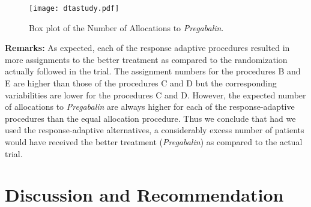 \begin{figure}
\begin{center}
\texttt{[image: dtastudy.pdf]}
\caption{Box plot of the Number of Allocations to \textit{Pregabalin}.}
\end{center}
\end{figure}

\newpage
\noindent\textbf{Remarks:} As expected, each of the response adaptive procedures resulted in more assignments to the better treatment as compared to the randomization actually followed in the trial. The assignment numbers for the procedures B and E are  higher than those of the procedures C and D  but the corresponding variabilities are lower for the procedures C and D. However, the expected number of allocations to \textit{Pregabalin} are always higher  for  each of  the response-adaptive procedures than the equal allocation procedure. Thus we conclude that had we used the  response-adaptive alternatives,  a considerably excess number of patients would have received the better treatment (\textit{Pregabalin}) as compared to the actual trial.

\section{Discussion and Recommendation}

